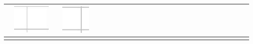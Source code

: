 \documentclass[10pt]{article}
\begin{document}
\begin{center}
\begin{tabular}{|c|c|c|c|c|c|c|c|c|c|c|c|c|c|c|c|c|c|c|c|c|c|c|c|c|c|c|}
 & \includegraphics[max width=\textwidth]{2024_11_21_d51d653f4fe4a5bb0c33g-15(5)}
 &  & \includegraphics[max width=\textwidth]{2024_11_21_d51d653f4fe4a5bb0c33g-15(10)}
 &  &  \\
\hline
 &  &  &  &  &  &  &  &  &  &  &  &  &  &  &  &  &  &  &  &  &  &  &  &  &  &  \\
\hline
\end{tabular}
\end{center}
\end{document}
